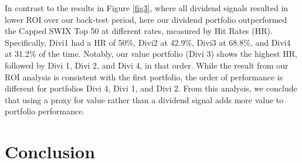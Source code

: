 \documentclass[10pt,preprint, authoryear]{elsarticle}
\numberwithin{equation}{section}
\numberwithin{figure}{section}
\numberwithin{table}{section}
\begin{document}
In contrast to the results in Figure \ref{fig3}, where all dividend
signals resulted in lower ROI over our back-test period, here our
dividend portfolio outperformed the Capped SWIX Top 50 at different
rates, measured by Hit Rates (HR). Specifically, Divi1 had a HR of 50\%,
Divi2 at 42.9\%, Divi3 at 68.8\%, and Divi4 at 31.2\% of the time.
Notably, our value portfolio (Divi 3) shows the highest HR, followed by
Divi 1, Divi 2, and Divi 4, in that order. While the result from our ROI
analysis is consistent with the first portfolio, the order of
performance is different for portfolios Divi 4, Divi 1, and Divi 2. From
this analysis, we conclude that using a proxy for value rather than a
dividend signal adds more value to portfolio performance.

\hypertarget{conclusion}{%
\section*{Conclusion}\label{conclusion}}
\end{document}
